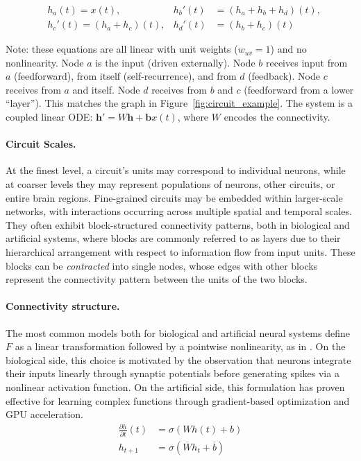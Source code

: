 \begin{align*}
    &h_a(t) = x(t),&h_b'(t) &= (h_a + h_b + h_d)(t),\\
    &h_c'(t) = (h_a + h_c)(t),&h_d'(t) &= (h_b + h_c)(t)
\end{align*}

\begin{ThomasAnnotation}
Note: these equations are all linear with unit weights ($w_{uv}=1$) and no nonlinearity. Node $a$ is the input (driven externally). Node $b$ receives input from $a$ (feedforward), from itself (self-recurrence), and from $d$ (feedback). Node $c$ receives from $a$ and itself. Node $d$ receives from $b$ and $c$ (feedforward from a lower ``layer''). This matches the graph in Figure~\ref{fig:circuit_example}. The system is a coupled linear ODE: $\mathbf{h}' = W\mathbf{h} + \mathbf{b}x(t)$, where $W$ encodes the connectivity.
\end{ThomasAnnotation}

\paragraph{Circuit Scales.}
At the finest level, a circuit's units may correspond to individual neurons, while at coarser levels they may represent populations of neurons, other circuits, or entire brain regions. Fine-grained circuits may be embedded within larger-scale networks, with interactions occurring across multiple spatial and temporal scales. They often exhibit block-structured connectivity patterns, both in biological and artificial systems, where blocks are commonly referred to as layers due to their hierarchical arrangement with respect to information flow from input units. These blocks can be \emph{contracted} into single nodes, whose edges with other blocks represent the connectivity pattern between the units of the two blocks.

\paragraph{Connectivity structure.}
The most common models both for biological and artificial neural systems define $F$ as a linear transformation followed by a pointwise nonlinearity, as in . On the biological side, this choice is motivated by the observation that neurons integrate their inputs linearly through synaptic potentials before generating spikes via a nonlinear activation function. On the artificial side, this formulation has proven effective for learning complex functions through gradient-based optimization and GPU acceleration.
\begin{align}
\label{eq:neural_circuit:continuous_linear}
\frac{ \partial h}{\partial t}(t) &= \sigma\left(W h(t) + b \right)\\
\label{eq:neural_circuit:discrete_linear}
h_{t+1} &= \sigma\left(\overline{W} h_t + \overline{b}\right)
\end{align}

